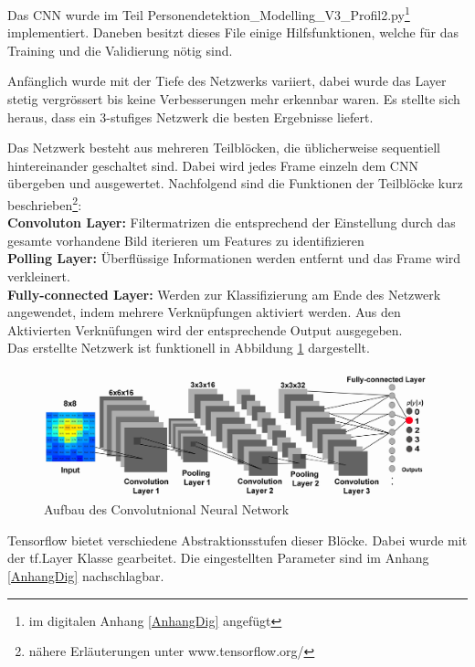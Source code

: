 Das \ac{CNN} wurde im Teil Personendetektion\_Modelling\_V3\_Profil2.py\footnote{im digitalen Anhang \ref{AnhangDig} angefügt} implementiert. Daneben besitzt dieses File einige Hilfsfunktionen, welche für das Training und die Validierung nötig sind.

Anfänglich wurde mit der Tiefe des Netzwerks variiert, dabei wurde das Layer stetig vergrössert bis keine Verbesserungen mehr erkennbar waren. Es stellte sich heraus, dass ein 3-stufiges Netzwerk die besten Ergebnisse liefert.

Das Netzwerk besteht aus mehreren Teilblöcken, die üblicherweise sequentiell hintereinander geschaltet sind. Dabei wird jedes Frame einzeln dem CNN übergeben und ausgewertet. Nachfolgend sind die Funktionen der Teilblöcke kurz beschrieben\footnote{nähere Erläuterungen unter www.tensorflow.org/ }: \\

\textbf{Convoluton Layer:} Filtermatrizen die entsprechend der Einstellung durch das gesamte vorhandene Bild iterieren um Features zu identifizieren   \\

\textbf{Polling Layer:} Überflüssige Informationen werden entfernt und das Frame wird verkleinert.   \\

\textbf{Fully-connected Layer:} Werden zur Klassifizierung am Ende des Netzwerk angewendet, indem mehrere Verknüpfungen aktiviert werden. Aus den Aktivierten Verknüfungen wird der entsprechende Output ausgegeben.   \\

Das erstellte Netzwerk ist funktionell in Abbildung \ref{fig:CNN} dargestellt.
\begin{figure}[H]
	\centering
	\includegraphics[width=1\textwidth]
	{fig/CNN_broschuere.jpg}
	\caption[Aufbau des Convolutional Neural Network]{Aufbau des Convolutnional Neural Network}
	\label{fig:CNN}
\end{figure}

Tensorflow bietet verschiedene Abstraktionsstufen dieser Blöcke. Dabei wurde mit der tf.Layer Klasse gearbeitet. Die eingestellten Parameter sind im  Anhang \ref{AnhangDig} nachschlagbar.


